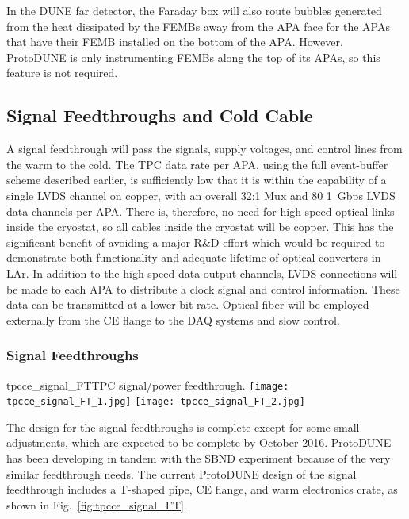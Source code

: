 In the DUNE far detector, the Faraday box will also route bubbles generated from the heat dissipated 
by the FEMBs away from the APA face for the APAs that have their FEMB installed on the bottom of
the APA. However, ProtoDUNE is only instrumenting FEMBs along the top of its APAs, so this feature
is not required.

%
\subsection{Signal Feedthroughs and Cold Cable}
\label{subsec:ce_feedthrough}

A signal feedthrough will pass the signals, supply voltages, and control lines from the warm to the cold.
The TPC data rate per APA, using the full event-buffer scheme described earlier,
is sufficiently low that it is within the capability of a single LVDS channel on copper,
with an overall 32:1 Mux and 80 1~Gbps LVDS data channels per APA.
There is, therefore, no need for high-speed optical links inside the 
cryostat, so all cables inside the cryostat will be copper.
This has the significant benefit of avoiding a major R\&D effort which would be required to demonstrate
both functionality and adequate lifetime of optical converters in LAr.
In addition to the high-speed data-output channels,
LVDS connections will be made to each APA to distribute a clock signal and control information.
These data can be transmitted at a lower bit rate.
Optical fiber will be employed externally from the CE flange to the DAQ systems and slow control.

%
\subsubsection{Signal Feedthroughs}
\label{subsubsec:ce_feedthroughs}

\begin{cdrfigure}{tpcce_signal_FT}{TPC signal/power feedthrough.}
\texttt{[image: tpcce\_signal\_FT\_1.jpg]}
\texttt{[image: tpcce\_signal\_FT\_2.jpg]}
\end{cdrfigure}

The design for the signal feedthroughs is complete except for some small adjustments,
which are expected to be complete by October 2016.
ProtoDUNE has been developing in tandem with the SBND experiment because of the very similar feedthrough needs.
The current ProtoDUNE design of the signal feedthrough includes a T-shaped pipe, CE flange, and warm electronics crate, as shown in Fig.~\ref{fig:tpcce_signal_FT}.

